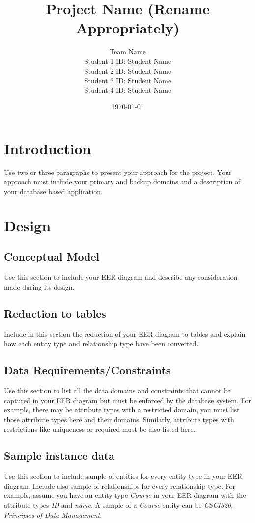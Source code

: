 \documentclass[12pt]{article}
\title{Project Name (Rename Appropriately)}
\date{\today}
\author{Team Name \\
Student 1 ID: Student Name\\
        Student 2 ID: Student Name\\
        Student 3 ID: Student Name\\
        Student 4 ID: Student Name\\
        }
\begin{document}
\maketitle

\section{Introduction}
Use two or three paragraphs to present your approach for the project. Your approach must include your primary and backup domains and a description of your database based application.

\section{Design}
\subsection{Conceptual Model}
Use this section to include your EER diagram and describe any consideration made during its design.
\subsection{Reduction to tables}
Include in this section the reduction of your EER diagram to tables and explain how each entity type and relationship type have been converted.
\subsection{Data Requirements/Constraints}
Use this section to list all the data domains and constraints that cannot be captured in your EER diagram but must be enforced by the database system. For example, there may be attribute types with a restricted domain, you must list those attribute types here and their domains. Similarly, attribute types with restrictions like uniqueness or required must be also listed here.
\subsection{Sample instance data}
Use this section to include sample of entities for every entity type in your EER diagram. Include also sample of relationships for every relationship type. For example, assume you have an entity type \emph{Course} in your EER diagram with the attribute types \emph{ID} and \emph{name}. A sample of a \emph{Course} entity can be \emph{CSCI320, Principles of Data Management}.\\
\end{document}
